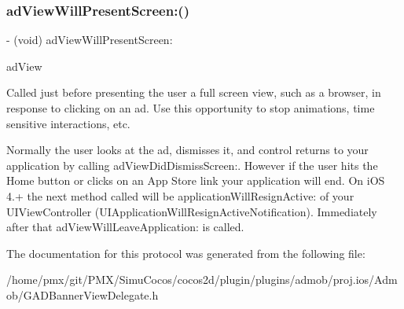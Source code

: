 \subsubsection{\texorpdfstring{ad\+View\+Will\+Present\+Screen\+:()}{adViewWillPresentScreen:()}}
{\footnotesize\ttfamily -\/ (void) ad\+View\+Will\+Present\+Screen\+: \begin{DoxyParamCaption}\item[{(\hyperlink{interfaceGADBannerView}{G\+A\+D\+Banner\+View} $\ast$)}]{ad\+View }\end{DoxyParamCaption}\hspace{0.3cm}{\ttfamily [optional]}}

Called just before presenting the user a full screen view, such as a browser, in response to clicking on an ad. Use this opportunity to stop animations, time sensitive interactions, etc.

Normally the user looks at the ad, dismisses it, and control returns to your application by calling ad\+View\+Did\+Dismiss\+Screen\+:. However if the user hits the Home button or clicks on an App Store link your application will end. On i\+OS 4.+ the next method called will be application\+Will\+Resign\+Active\+: of your U\+I\+View\+Controller (U\+I\+Application\+Will\+Resign\+Active\+Notification). Immediately after that ad\+View\+Will\+Leave\+Application\+: is called. 

The documentation for this protocol was generated from the following file\+:\begin{DoxyCompactItemize}
\item 
/home/pmx/git/\+P\+M\+X/\+Simu\+Cocos/cocos2d/plugin/plugins/admob/proj.\+ios/\+Admob/G\+A\+D\+Banner\+View\+Delegate.\+h\end{DoxyCompactItemize}
